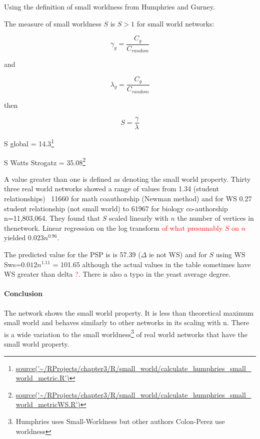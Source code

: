Using the definition of small worldness from Humphries and Gurney.

The measure of small worldness $S$ is $S>1$ for small world networks:

\begin{equation}
    \gamma_g = \frac{C_g}{C_{random}}
\end{equation}

and

\begin{equation}
    \lambda_g = \frac{C_g}{C_{random}}
\end{equation}


then

\begin{equation}
    S = \frac{\gamma}{\lambda}
\end{equation}

S global =  14.3\footnote{\url{source('~/RProjects/chapter3/R/small_world/calculate_humphries_small_world_metric.R')}}

S Watts Strogatz = 35.08\footnote{\url{source('~/RProjects/chapter3/R/small_world/calculate_humphries_small_world_metricWS.R')}}

A value greater than one is defined as denoting the small world property\cite{humphries2008network}. Thirty three real world networks showed a range of values from   1.34 (student relationships) ~11660 for math coauthorship (Newman method)  and for WS 0.27 student relationship (not small world) to 61967 for biology co-authorship n=11,803,064. They found that $S$ scaled linearly with $n$ the number of vertices in thenetwork. Linear regression on the log transform \textcolor{red}{of what presumably $S$ on $n$} yielded $0.023n^{0.96}$.

The predicted value for the PSP is is 57.39 ($\Delta$ ie not WS) and for $S$ using WS Sws=$0.012n^{1.11}$ = 101.65 
although the actual values in the table sometimes have WS greater than delta \textcolor{red}{?}. There is also a typo in the yeast average degree. 


\paragraph{Conclusion} The network shows the small world property. It is less than theoretical maximum small world and behaves similarly to other networks in its scaling with n. There is a wide variation to the small worldness\footnote{Humphries uses Small-Worldness but other authors Colon-Perez use worldness} of real world networks that have the small world property. 



